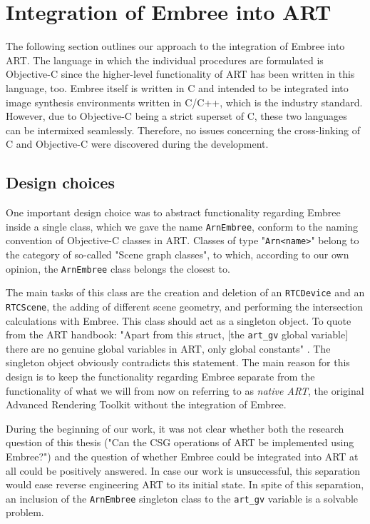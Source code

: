 \chapter{Integration of Embree into ART}
\label{chap:integration}

The following section outlines our approach to the integration of Embree into ART. The language in which the individual procedures are formulated is Objective-C since the higher-level functionality of ART has been written in this language, too. Embree itself is written in C and intended to be integrated into image synthesis environments written in C/C++, which is the industry standard. However, due to Objective-C being a strict superset of C, these two languages can be intermixed seamlessly. Therefore, no issues concerning the cross-linking of C and Objective-C were discovered during the development.

\section{Design choices}

One important design choice was to abstract functionality regarding Embree inside a single class, which we gave the name \texttt{ArnEmbree}, conform to the naming convention of Objective-C classes in ART. Classes of type "\texttt{Arn<name>}" belong to the category of so-called "Scene graph classes", to which, according to our own opinion, the \texttt{ArnEmbree} class belongs the closest to.

The main tasks of this class are the creation and deletion of an \texttt{RTCDevice} and an \texttt{RTCScene}, the adding of different scene geometry, and performing the intersection calculations with Embree. This class should act as a singleton object. To quote from the ART handbook: "Apart from this struct, [the \texttt{art\_gv} global variable] there are no genuine global variables in ART, only global constants" \cite[Chapter 4.1.2]{arthandbook}. The singleton object obviously contradicts this statement. The main reason for this design is to keep the functionality regarding Embree separate from the functionality of what we will from now on referring to as \emph{native ART}, the original Advanced Rendering Toolkit without the integration of Embree.

During the beginning of our work, it was not clear whether both the research question of this thesis ("Can the CSG operations of ART be implemented using Embree?") and the question of whether Embree could be integrated into ART at all could be positively answered. In case our work is unsuccessful, this separation would ease reverse engineering ART to its initial state.
In spite of this separation, an inclusion of the \texttt{ArnEmbree} singleton class to the \texttt{art\_gv} variable is a solvable problem.

